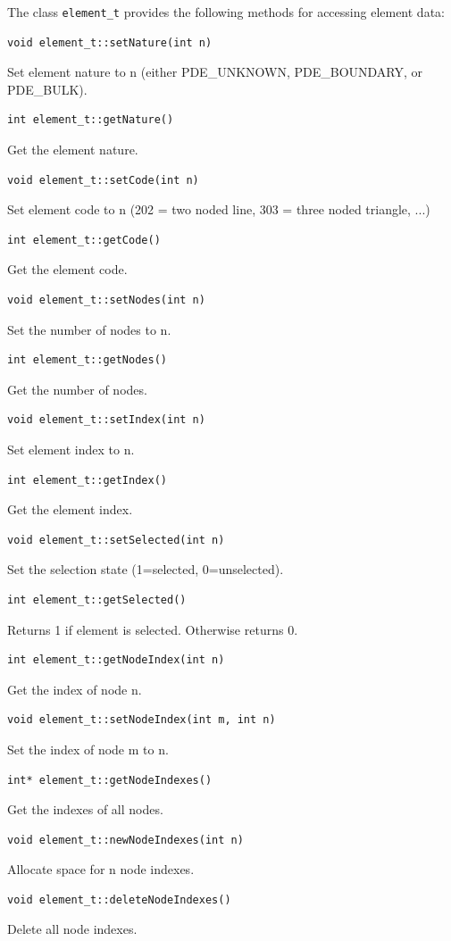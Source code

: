 \documentclass[a4paper,12pt]{article}
\begin{document}
The class {\tt element\_t} provides the following methods for accessing element data:
\begin{verbatim} 
void element_t::setNature(int n)
\end{verbatim}
Set element nature to n (either PDE\_UNKNOWN, PDE\_BOUNDARY, or PDE\_BULK).
\begin{verbatim}
int element_t::getNature()
\end{verbatim}
Get the element nature.
\begin{verbatim}
void element_t::setCode(int n)
\end{verbatim}
Set element code to n (202 = two noded line, 303 = three noded triangle, ...)
\begin{verbatim}
int element_t::getCode()
\end{verbatim}
Get the element code.
\begin{verbatim}
void element_t::setNodes(int n)
\end{verbatim}
Set the number of nodes to n.
\begin{verbatim}
int element_t::getNodes()
\end{verbatim}
Get the number of nodes.
\begin{verbatim}
void element_t::setIndex(int n)
\end{verbatim}
Set element index to n.
\begin{verbatim}
int element_t::getIndex()
\end{verbatim}
Get the element index.
\begin{verbatim}
void element_t::setSelected(int n)
\end{verbatim}
Set the selection state (1=selected, 0=unselected).
\begin{verbatim}
int element_t::getSelected()
\end{verbatim}
Returns 1 if element is selected. Otherwise returns 0.
\begin{verbatim}
int element_t::getNodeIndex(int n)
\end{verbatim}
Get the index of node n.
\begin{verbatim}
void element_t::setNodeIndex(int m, int n)
\end{verbatim}
Set the index of node m to n.
\begin{verbatim}
int* element_t::getNodeIndexes()
\end{verbatim}
Get the indexes of all nodes.
\begin{verbatim}
void element_t::newNodeIndexes(int n)
\end{verbatim}
Allocate space for n node indexes.
\begin{verbatim}
void element_t::deleteNodeIndexes()
\end{verbatim}
Delete all node indexes.
\end{document}

